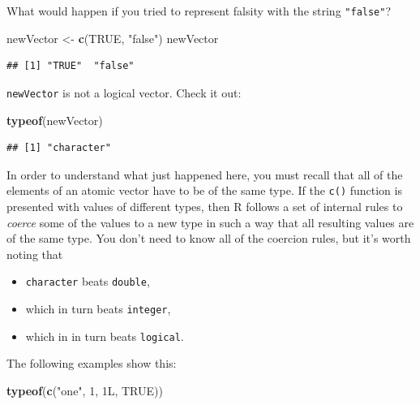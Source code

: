 \documentclass[]{book}
\makeatletter
\newenvironment{Shaded}{\begin{snugshade}}{\end{snugshade}}
\newcommand{\KeywordTok}[1]{\textcolor[rgb]{0.13,0.29,0.53}{\textbf{#1}}}
\newcommand{\DecValTok}[1]{\textcolor[rgb]{0.00,0.00,0.81}{#1}}
\newcommand{\StringTok}[1]{\textcolor[rgb]{0.31,0.60,0.02}{#1}}
\newcommand{\OtherTok}[1]{\textcolor[rgb]{0.56,0.35,0.01}{#1}}
\newcommand{\NormalTok}[1]{#1}
\providecommand{\tightlist}{%
  \setlength{\itemsep}{0pt}\setlength{\parskip}{0pt}}
\newenvironment{kframe}{%
\medskip{}
\setlength{\fboxsep}{.8em}
 \def\at@end@of@kframe{}%
 \ifinner\ifhmode%
  \def\at@end@of@kframe{\end{minipage}}%
  \begin{minipage}{\columnwidth}%
 \fi\fi%
 \def\FrameCommand##1{\hskip\@totalleftmargin \hskip-\fboxsep
 \colorbox{shadecolor}{##1}\hskip-\fboxsep
     \hskip-\linewidth \hskip-\@totalleftmargin \hskip\columnwidth}%
 \MakeFramed {\advance\hsize-\width
   \@totalleftmargin\z@ \linewidth\hsize
   \@setminipage}}%
 {\par\unskip\endMakeFramed%
 \at@end@of@kframe}
\renewenvironment{Shaded}{\begin{kframe}}{\end{kframe}}
\theoremstyle{definition}
\theoremstyle{definition}
\theoremstyle{definition}
\theoremstyle{remark}
\makeatother
\begin{document}
What would happen if you tried to represent falsity with the string
\texttt{"false"}?

\begin{Shaded}
\begin{Highlighting}[]
\NormalTok{newVector <-}\StringTok{ }\KeywordTok{c}\NormalTok{(}\OtherTok{TRUE}\NormalTok{, }\StringTok{"false"}\NormalTok{)}
\NormalTok{newVector}
\end{Highlighting}
\end{Shaded}

\begin{verbatim}
## [1] "TRUE"  "false"
\end{verbatim}

\texttt{newVector} is not a logical vector. Check it out:

\begin{Shaded}
\begin{Highlighting}[]
\KeywordTok{typeof}\NormalTok{(newVector)}
\end{Highlighting}
\end{Shaded}

\begin{verbatim}
## [1] "character"
\end{verbatim}

In order to understand what just happened here, you must recall that all
of the elements of an atomic vector have to be of the same type. If the
\texttt{c()} function is presented with values of different types, then
R follows a set of internal rules to \emph{coerce} some
of the values to a new type in such a way that all resulting values are
of the same type. You don't need to know all of the coercion rules, but
it's worth noting that

\begin{itemize}
\tightlist
\item
  \texttt{character} beats \texttt{double},
\item
  which in turn beats \texttt{integer},
\item
  which in in turn beats \texttt{logical}.
\end{itemize}

The following examples show this:

\begin{Shaded}
\begin{Highlighting}[]
\KeywordTok{typeof}\NormalTok{(}\KeywordTok{c}\NormalTok{(}\StringTok{"one"}\NormalTok{, }\DecValTok{1}\NormalTok{, 1L, }\OtherTok{TRUE}\NormalTok{))}
\end{Highlighting}
\end{Shaded}
\end{document}
